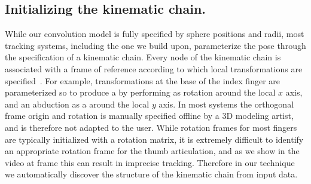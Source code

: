 \newpage

\begin{DRAFT}
\subsection{Initializing the kinematic chain.}
While our convolution model is fully specified by sphere positions and radii, most tracking systems, including the one we build upon, parameterize the pose through the specification of a kinematic chain. Every node of the kinematic chain is associated with a frame of reference according to which local transformations are specified~\cite[Fig.2-(middle)]{tagliasacchi2015robust}. For example, transformations at the base of the index finger are parameterized so to produce a  by performing as rotation around the local $x$ axis, and an abduction as a  around the local $y$ axis. In most systems the orthogonal frame origin and rotation is manually specified offline by a 3D modeling artist, and is therefore not adapted to the user. 
% 
While rotation frames for most fingers are typically initialized with a rotation matrix, it is extremely difficult to identify an appropriate rotation frame for the thumb articulation, and as we show in the video at frame \todo{[00:00]} this can result in imprecise tracking. Therefore in our technique we automatically discover the structure of the kinematic chain from input data. 
\end{DRAFT}


\endinput



